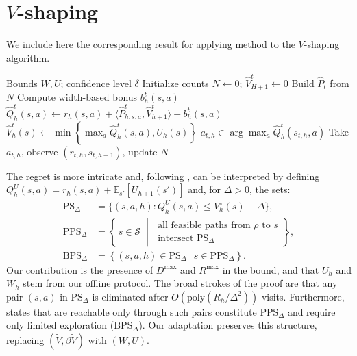 \documentclass[twoside]{article}
\newcommand{\BPS}{\mathrm{BPS}_{\Delta}} %
\newcommand{\PPS}{\mathrm{PPS}_{\Delta}} %
\newcommand{\PS}{\mathrm{PS}_{\Delta}} %
\newcommand{\lowv}{W} %
\newcommand{\highv}{U} %
\newcounter{notecounter}
\newcommand{\note}[2]{\refstepcounter{notecounter} \begin{leftbar}  \textcolor{red}{\textbf{#1}} \textcolor{violet}{(\textbf{Note} \thenotecounter)}: \begin{sf}{\color{blue} #2} \end{sf}  \end{leftbar}}
\newcommand{\note}[2]{}
\begin{document}


\section{$V$-shaping}\label{sec:V_shaping}
We include here the corresponding result for applying method to the $V$-shaping algorithm.

\begin{algorithm}[h!] 
\caption{$V$-shaping}
\label{alg:v_shaping}
\begin{algorithmic}[1]
\Require Bounds $\lowv, \highv$; confidence level $\delta$
\State Initialize counts $N \gets 0$; $\widehat{V}_{H+1}^{t} \gets 0$
    \State Build $\widehat{P}_t$ from $N$
            \State Compute width-based bonus $b_h^{t}(s,a)$
            \State $\widehat{Q}_h^t(s,a) {\gets} r_h(s,a) {+} \langle \widehat{P}^t_{h,s,a},\widehat{V}_{h+1}^t \rangle {+} b_h^{t}(s,a)$
        \EndFor
            \State $\widehat{V}_h^t(s) \gets \min\left\{ \max_{a} \widehat{Q}_h^t(s,a),  \highv_{h}(s) \right\}$
        \EndFor
    \EndFor
        \State $a_{t,h} \in \arg\max_{a} \widehat{Q}_h^t(s_{t,h}, a)$
        \State Take $a_{t,h}$, observe $(r_{t,h}, s_{t,h+1})$, update $N$
    \EndFor
\EndFor
\end{algorithmic}
\end{algorithm}
The regret is more intricate and, following \cite{gupta_unpacking_2022}, can be interpreted by defining $Q_h^{\highv}(s,a)=r_h(s,a)+\mathbb{E}_{s'}[\highv_{h+1}(s')]$ and, for $\Delta>0$, the sets:
\begin{align*}
\PS
&=\Big\{(s,a,h): Q_h^{\highv}(s,a)\le V_h^\star(s)-\Delta\Big\},\\
\PPS 
&= \left\{\, s \in \mathcal{S} \;\middle|\; 
\substack{\text{all feasible paths from } \rho \text{ to } s \\ 
\text{intersect } \PS} \right\},\\
\BPS
&= \left \lbrace (s,a,h) \in \PS ~ \vert ~ s \in \PPS  \right \rbrace.
\end{align*}
Our contribution is the presence of $D^{\max}$ and $R^{\max}$ in the bound, and that $\highv_{h}$ and $\lowv_{h}$ stem from our offline protocol.
The broad strokes of the proof are that any pair $(s,a)$ in $\PS$ is eliminated after $O(\mathrm{poly}(R_h/\Delta^2))$
visits. Furthermore, states that are reachable only through such pairs constitute $\PPS$ and require only
limited exploration ($\BPS$). Our adaptation preserves this structure, replacing $(\widetilde{V},\beta\widetilde{V})$ with $(\lowv,\highv)$.
\end{document}
